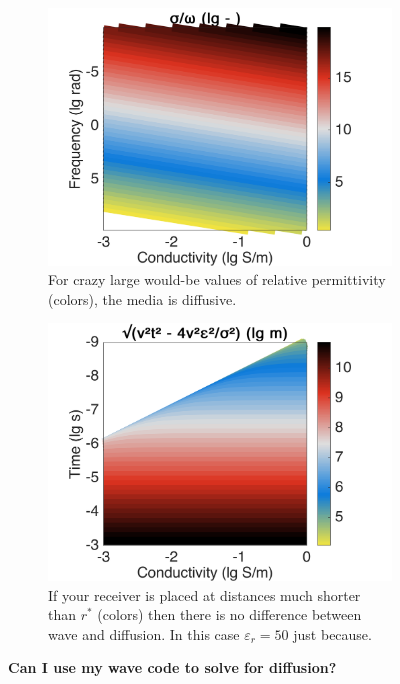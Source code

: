 \documentclass[a4paper,12pt]{article}
\begin{document}
	\begin{figure}[h!]
		\centering
		\begin{subfigure}[b]{0.7\linewidth}
			\includegraphics[width=\linewidth]{conductmedia.png}
			\caption{\centering For crazy large would-be values of relative permittivity (colors), the media is diffusive.}
			\label{fig:conductmedia}
		\end{subfigure}
		\begin{subfigure}[b]{0.7\linewidth}
			\includegraphics[width=\linewidth]{wavevsdiffu.png}
			\caption{\centering If your receiver is placed at distances much shorter than $r^*$ (colors) then there is no difference between wave and diffusion. In this case $\varepsilon_r = 50$ just because.}
			\label{fig:wavevsdiffu}
		\end{subfigure}
		\caption{{\bf Can I use my wave code to solve for diffusion?}}
	\end{figure}
\end{document}

